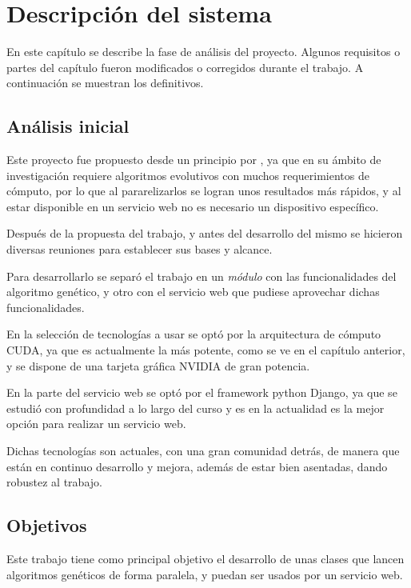 \chapter{Descripción del sistema}

\bigskip
En este capítulo se describe la fase de análisis del proyecto. Algunos requisitos o partes del capítulo fueron modificados o corregidos durante el trabajo. A continuación se muestran los definitivos.

\bigskip
\section{Análisis inicial}

Este proyecto fue propuesto desde un principio por {\tutor}, ya que en su ámbito de investigación requiere algoritmos evolutivos con muchos requerimientos de cómputo, por lo que al  pararelizarlos se logran unos resultados más rápidos, y al estar disponible en un servicio web no es necesario un dispositivo específico.

Después de la propuesta del trabajo, y antes del desarrollo del mismo se hicieron diversas reuniones para establecer sus bases y alcance. 

Para desarrollarlo se separó el trabajo en un \textit{módulo} con las funcionalidades del algoritmo genético, y otro con el servicio web que pudiese aprovechar dichas funcionalidades.

En la selección de tecnologías a usar se optó por la arquitectura de cómputo CUDA, ya que es actualmente la más potente, como se ve en el capítulo anterior, y se dispone de una tarjeta gráfica NVIDIA de gran potencia.

En la parte del servicio web se optó por el framework python Django, ya que se estudió con profundidad a lo largo del curso y es en la actualidad es la mejor opción para realizar un servicio web.

Dichas tecnologías son actuales, con una gran comunidad detrás, de manera que están en continuo desarrollo y mejora, además de estar bien asentadas, dando robustez al trabajo.


\newpage
\section{Objetivos}

Este trabajo tiene como principal objetivo el desarrollo de unas clases que lancen algoritmos genéticos de forma paralela, y puedan ser usados por un servicio web.

